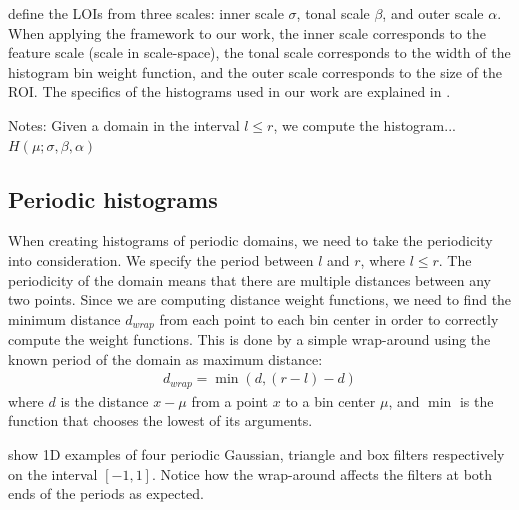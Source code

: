 \documentclass[thesis.tex]{subfiles}
\begin{document}
\citet{koenderink1999structure} define the LOIs from three scales: inner scale $\sigma$, tonal scale $\beta$, and outer scale $\alpha$. When applying the framework to our work, the inner scale corresponds to the feature scale (scale in scale-space), the tonal scale corresponds to the width of the histogram bin weight function, and the outer scale corresponds to the size of the ROI. The specifics of the histograms used in our work are explained in .

Notes:
Given a domain in the interval $l \leq r$, we compute the histogram...
$H(\mu;\sigma,\beta,\alpha)$

\subsection{Periodic histograms}
When creating histograms of periodic domains, we need to take the periodicity into consideration. We specify the period between $l$ and $r$, where $l \leq r$.
The periodicity of the domain means that there are multiple distances between any two points. Since we are computing distance weight functions, we need to find the minimum distance $d_{wrap}$ from each point to each bin center in order to correctly compute the weight functions. This is done by a simple wrap-around using the known period of the domain as maximum distance:
\begin{align*}
	d_{wrap} = \min(d,(r - l)-d)
\end{align*}
where $d$ is the distance $x - \mu$ from a point $x$ to a bin center $\mu$, and $\min$ is the function that chooses the lowest of its arguments.

  show 1D examples of four periodic Gaussian, triangle and box filters respectively on the interval $[-1,1]$. Notice how the wrap-around affects the filters at both ends of the periods as expected.
\end{document}
